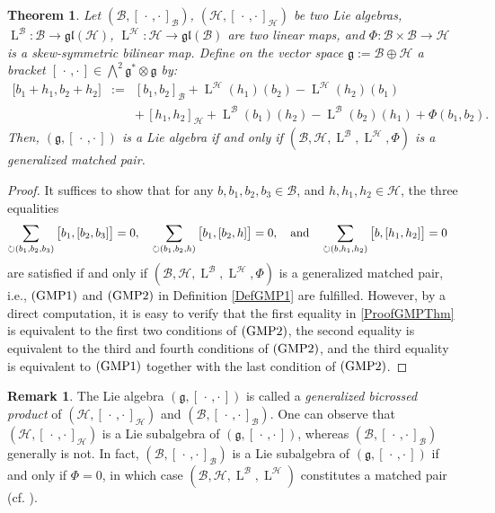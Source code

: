 \documentclass[final,1p,times,nopreprintline]{elsarticle}
\newtheorem{theorem}{Theorem}[section]
\theoremstyle{definition}
\newtheorem{remark}{Remark}[section]
\numberwithin{equation}{section}
\newcommand{\et}{\quad \textnormal{and}\quad}
\newcommand{\g}{\mathfrak{g}}
\newcommand{\h}{\mathcal{H}}
\newcommand{\lh}{\operatorname{L}^\h}
\newcommand{\lk}{\operatorname{L}^\kl}
\numberwithin{equation}{section}
\newcommand{\gl}{\mathfrak{gl}}
\newcommand{\cro}{[\,\cdot\,,\cdot\,]}
\newcommand{\kl}{\mathcal{B}}
\begin{document}
\begin{theorem}\label{ThmGMP1}
Let $(\kl,\cro_\kl)$, $(\h,\cro_\h)$ be two Lie algebras, $\lk:\kl\to\gl(\h)$, $\lh:\h\to\gl(\kl)$ are two linear maps, and $\Phi:\kl\times\kl\to\h$ is a skew-symmetric bilinear map. Define on the vector space $\g:=\kl\oplus\h$ a bracket $\cro\in\bigwedge^2\g^*\otimes\g$ by:
\begin{eqnarray}
\Big[b_1+h_1,b_2+h_2\Big]&:=&[b_1,b_2]_\kl+\lh(h_1)(b_2)-\lh(h_2)(b_1)\nonumber\\
&&+\,[h_1,h_2]_\h+\lk(b_1)(h_2)-\lk(b_2)(h_1)+\Phi(b_1,b_2).
\end{eqnarray}
Then, $(\g,\cro)$ is a Lie algebra if and only if $(\kl,\h,\lk,\lh,\Phi)$ is a generalized matched pair.\vspace{2mm}
\end{theorem}

\begin{proof}
It suffices to show that for any $b,b_1,b_2,b_3\in\kl$, and $h,h_1,h_2\in\h$, the three equalities
\begin{equation}\label{ProofGMPThm}
\displaystyle\sum_{\circlearrowright (b_1,b_2,b_3)}\big[b_1,[b_2,b_3]\big]=0,\quad\displaystyle\sum_{\circlearrowright (b_1,b_2,h)}\big[b_1,[b_2,h]\big]=0,\et\displaystyle\sum_{\circlearrowright (b,h_1,h_2)}\big[b,[h_1,h_2]\big]=0\quad
\end{equation}
are satisfied if and only if $(\kl,\h,\lk,\lh,\Phi)$ is a generalized matched pair, i.e., $(\textnormal{GMP}1)$ and $(\textnormal{GMP}2)$ in Definition \ref{DefGMP1} are fulfilled. However, by a direct computation, it is easy to verify that the first equality in \eqref{ProofGMPThm} is equivalent to the first two conditions of $(\textnormal{GMP}2)$, the second equality is equivalent to the third and fourth conditions of $(\textnormal{GMP}2)$, and the third equality is equivalent to $(\textnormal{GMP}1)$ together with the last condition of $(\textnormal{GMP}2)$.
\end{proof}

\begin{remark}\label{Rmq1GenBicrProd}
The Lie algebra $(\g,\cro)$ is called a \textit{generalized bicrossed product} of $(\h,\cro_\h)$ and $(\kl,\cro_\kl)$. One can observe that $(\h,\cro_\h)$ is a Lie subalgebra of $(\g,\cro)$, whereas $(\kl,\cro_\kl)$ generally is not. In fact, $(\kl,\cro_\kl)$ is a Lie subalgebra of $(\g,\cro)$ if and only if $\Phi = 0$, in which case $(\kl,\h,\lk,\lh)$ constitutes a matched pair (cf. \cite{LW,Maj}).
\end{remark}
\end{document}
